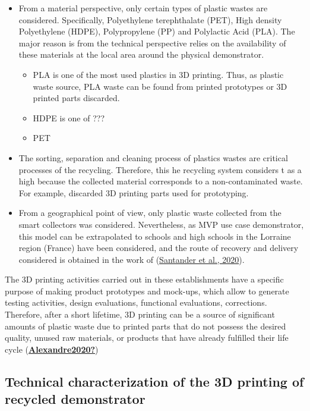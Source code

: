 \documentclass[
  11pt,
]{article}
\begin{document}
\begin{itemize}
\item
  From a material perspective, only certain types of plastic wastes are
  considered. Specifically, Polyethylene terephthalate (PET), High
  density Polyethylene (HDPE), Polypropylene (PP) and Polylactic Acid
  (PLA). The major reason is from the technical perspective relies on
  the availability of these materials at the local area around the
  physical demonstrator.

  \begin{itemize}
  \item
    PLA is one of the most used plastics in 3D printing. Thus, as
    plastic waste source, PLA waste can be found from printed prototypes
    or 3D printed parts discarded.
  \item
    HDPE is one of ???
  \item
    PET
  \end{itemize}
\item
  The sorting, separation and cleaning process of plastics wastes are
  critical processes of the recycling. Therefore, this he recycling
  system considers t as a high because the collected material
  corresponds to a non-contaminated waste. For example, discarded 3D
  printing parts used for prototyping.
\item
  From a geographical point of view, only plastic waste collected from
  the smart collectors was considered. Nevertheless, as MVP use case
  demonstrator, this model can be extrapolated to schools and high
  schools in the Lorraine region (France) have been considered, and the
  route of recovery and delivery considered is obtained in the work of
  (\protect\hyperlink{ref-Santander2020}{Santander et al., 2020}).
\end{itemize}

The 3D printing activities carried out in these establishments have a
specific purpose of making product prototypes and mock-ups, which allow
to generate testing activities, design evaluations, functional
evaluations, corrections. Therefore, after a short lifetime, 3D printing
can be a source of significant amounts of plastic waste due to printed
parts that do not possess the desired quality, unused raw materials, or
products that have already fulfilled their life cycle
(\protect\hyperlink{ref-Alexandre2020}{\textbf{Alexandre2020?}})

\hypertarget{technical-characterization-of-the-3d-printing-of-recycled-demonstrator}{%
\subsection{Technical characterization of the 3D printing of recycled
demonstrator}\label{technical-characterization-of-the-3d-printing-of-recycled-demonstrator}}
\end{document}
